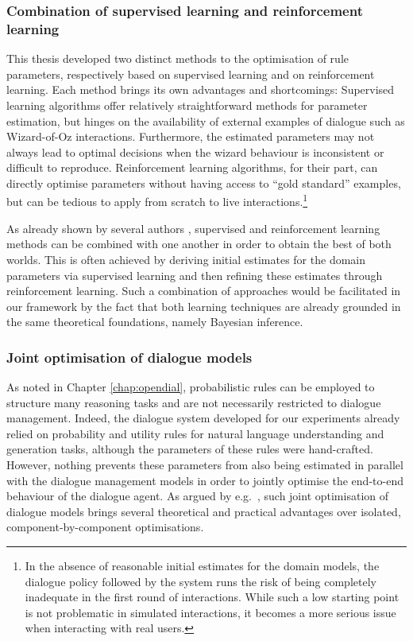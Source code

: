 \subsubsection*{Combination of supervised learning and reinforcement learning}

This thesis developed two distinct methods to the optimisation of rule parameters, respectively based on supervised learning and on reinforcement learning.  Each method brings its own advantages and shortcomings: Supervised learning algorithms offer relatively straightforward methods for parameter estimation, but hinges on the availability of external examples of dialogue such as Wizard-of-Oz interactions.  Furthermore, the estimated parameters may not always lead to optimal decisions when the wizard behaviour is inconsistent or difficult to reproduce.  Reinforcement learning algorithms, for their part, can directly optimise parameters without having access to ``gold standard'' examples, but can be tedious to apply from scratch to live interactions.\footnote{In the absence of reasonable initial estimates for the domain models, the dialogue policy followed by the system runs the risk of being completely inadequate in the first round of interactions.  While such a low starting point is not problematic in simulated interactions, it becomes a more serious issue when interacting with real users.} 

As already shown by several authors \cite[see e.g.][]{williams2003,rieser2006,Henderson:2008}, supervised and reinforcement learning methods can be combined with one another in order to obtain the best of both worlds. This is often achieved by deriving initial estimates for the domain parameters via supervised learning and then refining these estimates through reinforcement learning. Such a combination of approaches would be facilitated in our framework by the fact that both learning techniques are already grounded in the same theoretical foundations, namely Bayesian inference. 

\subsubsection*{Joint optimisation of dialogue models}

As noted in Chapter \ref{chap:opendial}, probabilistic rules can be employed to structure many reasoning tasks and are not necessarily restricted to dialogue management. Indeed, the dialogue system developed for our experiments already relied on probability and utility rules for natural language understanding and generation tasks, although the parameters of these rules were hand-crafted. However, nothing prevents these parameters from also being estimated in parallel with the dialogue management models in order to jointly optimise the end-to-end behaviour of the dialogue agent.  As argued by e.g.\ \cite{Lemon:2011}, such joint optimisation of dialogue models brings several theoretical and practical advantages over isolated, component-by-component optimisations.

